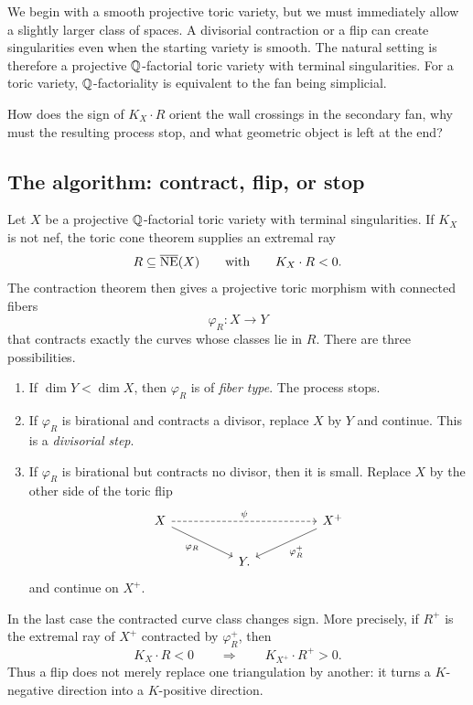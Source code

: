 We begin with a smooth projective toric variety, but we must immediately
allow a slightly larger class of spaces.  A divisorial contraction or a
flip can create singularities even when the starting variety is smooth.
The natural setting is therefore a projective \(\mathbb{Q}\)-factorial toric
variety with terminal singularities.  For a toric variety,
\(\mathbb{Q}\)-factoriality is equivalent to the fan being simplicial.

\begin{guidingquestion}
How does the sign of \(K_X\cdot R\) orient the wall crossings in the
secondary fan, why must the resulting process stop, and what geometric
object is left at the end?
\end{guidingquestion}

\subsection{The algorithm: contract, flip, or stop}

Let \(X\) be a projective \(\mathbb{Q}\)-factorial toric variety with terminal
singularities.  If \(K_X\) is not nef, the toric cone theorem supplies
an extremal ray
\[
R\subseteq\overline{\operatorname{NE}}(X)
\qquad\text{with}\qquad
K_X\cdot R<0.
\]
The contraction theorem then gives a projective toric morphism with
connected fibers
\[
\varphi_R:X\longrightarrow Y
\]
that contracts exactly the curves whose classes lie in \(R\).  There
are three possibilities.

\begin{enumerate}
\item If \(\dim Y<\dim X\), then \(\varphi_R\) is of \emph{fiber type}.
The process stops.

\item If \(\varphi_R\) is birational and contracts a divisor, replace
\(X\) by \(Y\) and continue.  This is a \emph{divisorial step}.

\item If \(\varphi_R\) is birational but contracts no divisor, then it
is small.  Replace \(X\) by the other side of the toric flip
\[
\begin{tikzcd}[column sep=huge]
X \arrow[dr,"\varphi_R"']
  \arrow[rr,dashed,"\psi"]
&& X^+ \arrow[dl,"\varphi_R^+"]
\\
&Y.&
\end{tikzcd}
\]
and continue on \(X^+\).
\end{enumerate}

In the last case the contracted curve class changes sign.  More
precisely, if \(R^+\) is the extremal ray of \(X^+\) contracted by
\(\varphi_R^+\), then
\[
K_X\cdot R<0
\qquad\Longrightarrow\qquad
K_{X^+}\cdot R^+>0.
\]
Thus a flip does not merely replace one triangulation by another: it
turns a \(K\)-negative direction into a \(K\)-positive direction.

